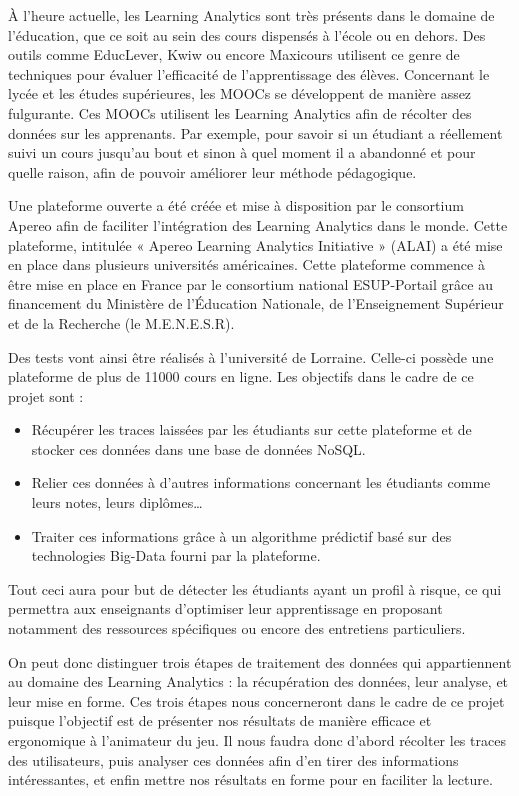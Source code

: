            À l’heure actuelle, les Learning Analytics sont très présents dans le domaine de l’éducation, que ce soit au sein des cours dispensés à l’école ou en dehors. Des outils comme EducLever, Kwiw ou encore Maxicours utilisent ce genre de techniques pour évaluer l’efficacité de l’apprentissage des élèves. Concernant le lycée et les études supérieures, les MOOCs se développent de manière assez fulgurante. Ces MOOCs utilisent les Learning Analytics afin de récolter des données sur les apprenants. Par exemple, pour savoir si un étudiant a réellement suivi un cours jusqu’au bout et sinon à quel moment il a abandonné et pour quelle raison, afin de pouvoir améliorer leur méthode pédagogique.
        
            Une plateforme ouverte a été créée et mise à disposition par le consortium Apereo afin de faciliter l’intégration des Learning Analytics dans le monde. Cette plateforme, intitulée « Apereo Learning Analytics Initiative » (ALAI) a été mise en place dans plusieurs universités américaines. Cette plateforme commence à être mise en place en France par le consortium national ESUP-Portail grâce au financement du Ministère de l’Éducation Nationale, de l’Enseignement Supérieur et de la Recherche (le M.E.N.E.S.R).
       
            Des tests vont ainsi être réalisés à l’université de Lorraine. Celle-ci possède une plateforme de plus de 11000 cours en ligne.
            Les objectifs dans le cadre de ce projet sont :
            \begin{itemize}
                \item Récupérer les traces laissées par les étudiants sur cette plateforme et de stocker ces données dans une base de données NoSQL.
                \item Relier ces données à d’autres informations concernant les étudiants comme leurs notes, leurs diplômes…
                \item Traiter ces informations grâce à un algorithme prédictif basé sur des technologies Big-Data fourni par la plateforme.
            \end{itemize}


           Tout ceci aura pour but de détecter les étudiants ayant un profil à risque, ce qui permettra aux enseignants d’optimiser leur apprentissage en proposant notamment des ressources spécifiques ou encore des entretiens particuliers.
        
           On peut donc distinguer trois étapes de traitement des données qui appartiennent au domaine des Learning Analytics : la récupération des données, leur analyse, et leur mise en forme. Ces trois étapes nous concerneront dans le cadre de ce projet puisque l’objectif est de présenter nos résultats de manière efficace et ergonomique à l’animateur du jeu. Il nous faudra donc d’abord récolter les traces des utilisateurs, puis analyser ces données afin d’en tirer des informations intéressantes, et enfin mettre nos résultats en forme pour en faciliter la lecture.
      

